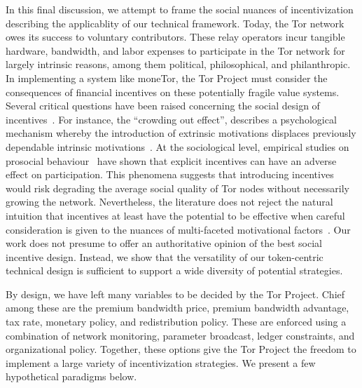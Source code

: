 In this final discussion, we attempt to frame the social nuances of incentivization describing the applicablity of our technical framework.
Today, the Tor network owes its success to voluntary contributors.
These relay operators incur tangible hardware, bandwidth, and labor expenses to participate in the Tor network for largely intrinsic reasons, among them political, philosophical, and philanthropic.
In implementing a system like moneTor, the Tor Project must consider the consequences of financial incentives on these potentially fragile value systems.
Several critical questions have been raised concerning the social design of incentives~\cite{jansenblogpost}.
For instance, the ``crowding out effect'', describes a psychological mechanism whereby the introduction of extrinsic motivations displaces previously dependable intrinsic motivations~\cite{10.1257/jep.25.4.191}.
At the sociological level, empirical studies on prosocial behaviour~\cite{10.1257/aer.96.5.1652} have shown that explicit incentives can have an adverse effect on participation.
This phenomena suggests that introducing incentives would risk degrading the average social quality of Tor nodes without necessarily growing the network.
Nevertheless, the literature does not reject the natural intuition that incentives at least have the potential to be effective when careful consideration is given to the nuances of multi-faceted motivational factors~\cite{10.1257/aer.96.5.1652}.
Our work does not presume to offer an authoritative opinion of the best social incentive design.
Instead, we show that the versatility of our token-centric technical design is sufficient to support a wide diversity of potential strategies.

By design, we have left many variables to be decided by the Tor Project.
Chief among these are the premium bandwidth price, premium bandwidth advantage, tax rate, monetary policy, and redistribution policy.
These are enforced using a combination of network monitoring, parameter broadcast, ledger constraints, and organizational policy.
Together, these options give the Tor Project the freedom to implement a large variety of incentivization strategies.
We present a few hypothetical paradigms below.

